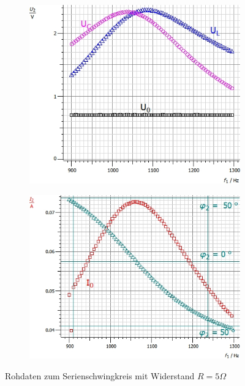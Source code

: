 \documentclass[12pt,a4paper]{article}
\begin{document}
\begin{figure}[H]
	\centering
	\begin{subfigure}{0.49\textwidth}
		\centering
		\includegraphics[width=\textwidth]{Daten/S5_Rohdaten_U.jpg}
	\end{subfigure}
	\begin{subfigure}{0.49\textwidth}
		\centering
		\includegraphics[width=\textwidth]{Daten/S5_Rohdaten_I.jpg}
	\end{subfigure}
	\caption{Rohdaten zum Serienschwingkreis mit Widerstand $R=5\Omega$}
	\label{Rohdaten_S5}
\end{figure}
\end{document}
